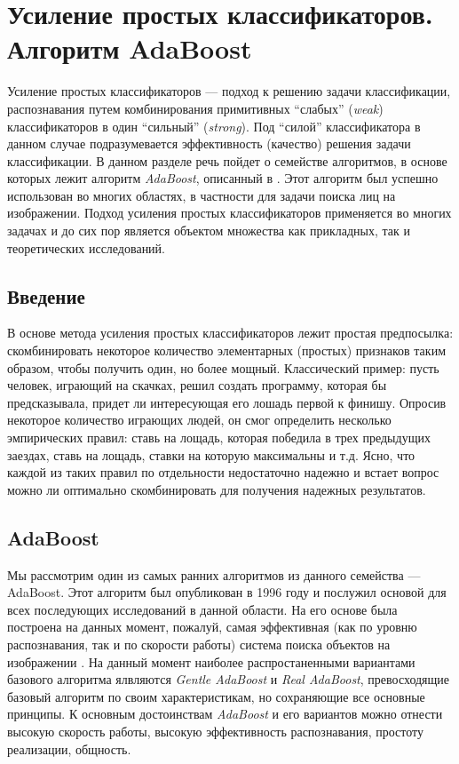 \section{Усиление простых классификаторов. Алгоритм AdaBoost}
Усиление простых классификаторов --- подход к решению задачи классификации, распознавания путем комбинирования примитивных ``слабых'' (\emph{weak}) классификаторов в один ``сильный'' (\emph{strong}). Под ``силой'' классификатора в данном случае подразумевается эффективность (качество) решения задачи классификации. В данном разделе речь пойдет о семействе алгоритмов, в основе которых лежит алгоритм \emph{AdaBoost}, описанный в \cite{freund99}. Этот алгоритм был успешно использован во многих областях, в частности для задачи поиска лиц на изображении. Подход усиления простых классификаторов применяется во многих задачах и до сих пор является объектом множества как прикладных, так и теоретических исследований.

\subsection{Введение}
В основе метода усиления простых классификаторов лежит простая предпосылка: скомбинировать некоторое количество элементарных (простых) признаков таким образом, чтобы получить один, но более мощный. Классический пример: пусть человек, играющий на скачках, решил создать программу, которая бы предсказывала, придет ли интересующая его лошадь первой к финишу. Опросив некоторое количество играющих людей, он смог определить несколько эмпирических правил: ставь на лощадь, которая победила в трех предыдущих заездах, ставь на лощадь, ставки на которую максимальны и т.д. Ясно, что каждой из таких правил по отдельности недостаточно надежно и встает вопрос можно ли оптимально скомбинировать для получения надежных результатов.

\subsection{AdaBoost}
Мы рассмотрим один из самых ранних алгоритмов из данного семейства --- AdaBoost. Этот алгоритм был опубликован в 1996 году и послужил основой для всех последующих исследований в данной области. На его основе была построена на данных момент, пожалуй, самая эффективная (как по уровню распознавания, так и по скорости работы) система поиска объектов на изображении \cite{viola01}. На данный момент наиболее распростаненными вариантами базового алгоритма ялвляются \emph{Gentle AdaBoost} и \emph{Real AdaBoost}, превосходящие базовый алгоритм по своим характеристикам, но сохраняющие все основные принципы. К основным достоинствам \emph{AdaBoost} и его вариантов можно отнести высокую скорость работы, высокую эффективность распознавания, простоту реализации, общность.

